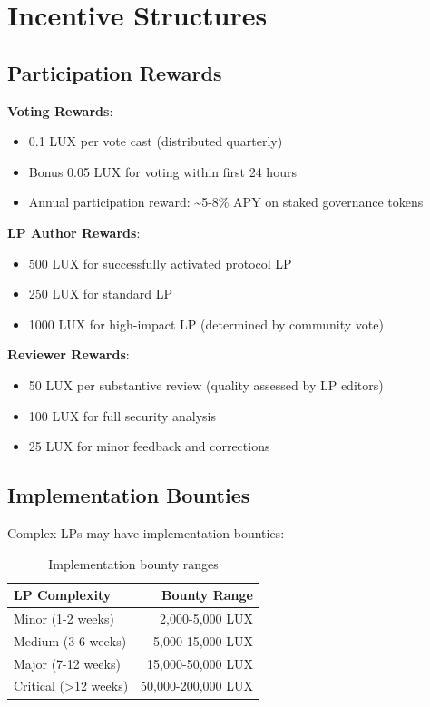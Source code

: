 \section{Incentive Structures}


\subsection{Participation Rewards}

\textbf{Voting Rewards}:
\begin{itemize}
\item 0.1 LUX per vote cast (distributed quarterly)
\item Bonus 0.05 LUX for voting within first 24 hours
\item Annual participation reward: \~{}5-8\% APY on staked governance tokens
\end{itemize}

\textbf{LP Author Rewards}:
\begin{itemize}
\item 500 LUX for successfully activated protocol LP
\item 250 LUX for standard LP
\item 1000 LUX for high-impact LP (determined by community vote)
\end{itemize}

\textbf{Reviewer Rewards}:
\begin{itemize}
\item 50 LUX per substantive review (quality assessed by LP editors)
\item 100 LUX for full security analysis
\item 25 LUX for minor feedback and corrections
\end{itemize}

\subsection{Implementation Bounties}

Complex LPs may have implementation bounties:

\begin{table}[h]
\centering
\begin{tabular}{@{}lr@{}}
\toprule
\textbf{LP Complexity} & \textbf{Bounty Range} \\ \midrule
Minor (1-2 weeks) & 2,000-5,000 LUX \\
Medium (3-6 weeks) & 5,000-15,000 LUX \\
Major (7-12 weeks) & 15,000-50,000 LUX \\
Critical (>12 weeks) & 50,000-200,000 LUX \\ \bottomrule
\end{tabular}
\caption{Implementation bounty ranges}
\end{table}

